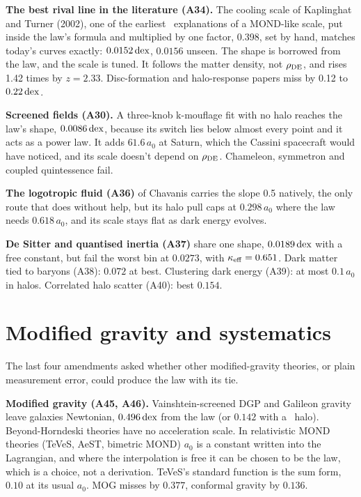 \textbf{The best rival line in the literature (A34).} The cooling scale of Kaplinghat and Turner (2002), one of the earliest \LCDM\ explanations of a MOND-like scale, put inside the law's formula and multiplied by one factor, 0.398, set by hand, matches today's curves exactly: $0.0152\,\mathrm{dex}$, $0.0156$ unseen. The shape is borrowed from the law, and the scale is tuned. It follows the matter density, not $\rho_{\rm DE}$, and rises 1.42 times by $z=2.33$. Disc-formation and halo-response papers miss by 0.12 to $0.22\,\mathrm{dex}$.

\textbf{Screened fields (A30).} A three-knob k-mouflage fit with no halo reaches the law's shape, $0.0086\,\mathrm{dex}$, because its switch lies below almost every point and it acts as a power law. It adds $61.6\,a_0$ at Saturn, which the Cassini spacecraft would have noticed, and its scale doesn't depend on $\rho_{\rm DE}$. Chameleon, symmetron and coupled quintessence fail.

\textbf{The logotropic fluid (A36)} of Chavanis carries the slope 0.5 natively, the only route that does without help, but its halo pull caps at $0.298\,a_0$ where the law needs $0.618\,a_0$, and its scale stays flat as dark energy evolves.

\textbf{De Sitter and quantised inertia (A37)} share one shape, $0.0189\,\mathrm{dex}$ with a free constant, but fail the worst bin at $0.0273$, with $\kappa_{\rm eff}=0.651$. Dark matter tied to baryons (A38): $0.072$ at best. Clustering dark energy (A39): at most $0.1\,a_0$ in halos. Correlated halo scatter (A40): best $0.154$.

\section{Modified gravity and systematics}

The last four amendments asked whether other modified-gravity theories, or plain measurement error, could produce the law with its tie.

\textbf{Modified gravity (A45, A46).} Vainshtein-screened DGP and Galileon gravity leave galaxies Newtonian, $0.496\,\mathrm{dex}$ from the law (or $0.142$ with a \LCDM\ halo). Beyond-Horndeski theories have no acceleration scale. In relativistic MOND theories (TeVeS, AeST, bimetric MOND) $a_0$ is a constant written into the Lagrangian, and where the interpolation is free it can be chosen to be the law, which is a choice, not a derivation. TeVeS's standard function is the sum form, $0.10$ at its usual $a_0$. MOG misses by $0.377$, conformal gravity by $0.136$.

